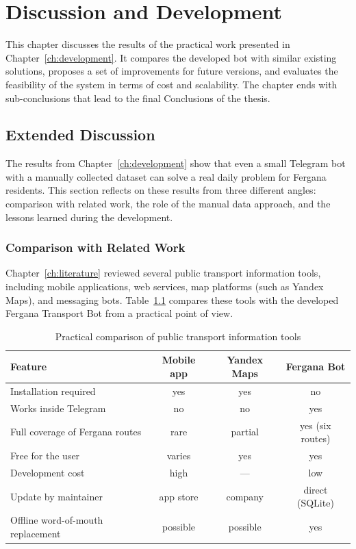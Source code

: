 \chapter{Discussion and Development}
\label{ch:discussion}

This chapter discusses the results of the practical work presented in
Chapter~\ref{ch:development}. It compares the developed bot with similar
existing solutions, proposes a set of improvements for future versions, and
evaluates the feasibility of the system in terms of cost and scalability.
The chapter ends with sub-conclusions that lead to the final Conclusions of
the thesis.

\section{Extended Discussion}
\label{sec:extended-discussion}

The results from Chapter~\ref{ch:development} show that even a small
Telegram bot with a manually collected dataset can solve a real daily
problem for Fergana residents. This section reflects on these results from
three different angles: comparison with related work, the role of the
manual data approach, and the lessons learned during the development.

\subsection{Comparison with Related Work}
\label{subsec:comparison}

Chapter~\ref{ch:literature} reviewed several public transport information
tools, including mobile applications, web services, map platforms (such as
Yandex Maps), and messaging bots. Table~\ref{tab:comparison-discussion}
compares these tools with the developed Fergana Transport Bot from a
practical point of view.

\begin{table}[h]
\centering
\caption{Practical comparison of public transport information tools}
\label{tab:comparison-discussion}
\begin{tabular}{lccc}
\hline
\textbf{Feature} & \textbf{Mobile app} & \textbf{Yandex Maps} &
\textbf{Fergana Bot} \\
\hline
Installation required & yes & yes & no \\
Works inside Telegram & no & no & yes \\
Full coverage of Fergana routes & rare & partial & yes (six routes) \\
Free for the user & varies & yes & yes \\
Development cost & high & --- & low \\
Update by maintainer & app store & company & direct (SQLite) \\
Offline word-of-mouth replacement & possible & possible & yes \\
\hline
\end{tabular}
\end{table}


